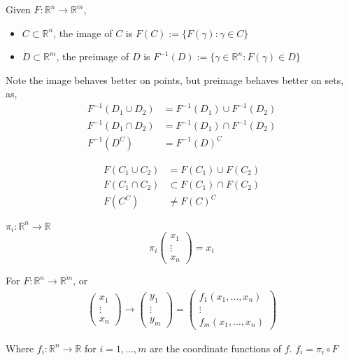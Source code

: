 \documentclass[a4paper]{article}
\numberwithin{equation}{section}
\newcommand{\R}{\mathbb{R}}
\begin{document}
\begin{definition}
    Given $F:\R^n\to\R^m$,
    \begin{itemize}
        \item $C\subset\R^n$, the image of $C$ is $F(C):=\{F(\gamma):\gamma\in C\}$
        \item $D\subset\R^m$, the preimage of $D$ is $F^{-1}(D):=\{\gamma\in\R^n:F(\gamma)\in D\}$
    \end{itemize}
    Note the image behaves better on points, but preimage behaves better on sets, as,
    \begin{align}
        F^{-1}(D_1\cup D_2)&=F^{-1}(D_1)\cup F^{-1}(D_2)\\
        F^{-1}(D_1\cap D_2)&=F^{-1}(D_1)\cap F^{-1}(D_2)\\
        F^{-1}(D^C)&=F^{-1}(D)^C
    \end{align}

    \begin{align}
        F(C_1\cup C_2)&=F(C_1)\cup F(C_2)\\
        F(C_1\cap C_2)&\subset F(C_1)\cap F(C_2)\\
        F(C^C)&\neq F(C)^C
    \end{align}
\end{definition}
\begin{definition}[Projection]
    $\pi_i:\R^n\to\R$
    \begin{equation}
        \pi_i\begin{pmatrix}
            x_1\\\vdots\\x_n
        \end{pmatrix}=x_i
    \end{equation}
\end{definition}
\begin{definition}
    For $F:\R^n\to\R^m$, or 
    \begin{align}
        \begin{pmatrix}
            x_1\\\vdots\\x_n
        \end{pmatrix}\to\begin{pmatrix}
            y_1\\\vdots\\y_m
        \end{pmatrix}=\begin{pmatrix}
            f_1(x_1,\dots,x_n)\\\vdots\\f_m(x_1,\dots,x_n)
        \end{pmatrix}
    \end{align}

    Where $f_i:\R^n\to\R$ for $i=1,\dots,m$ are the coordinate functions of $f$. $f_i=\pi_i\circ F$ 
\end{definition}
\end{document}
